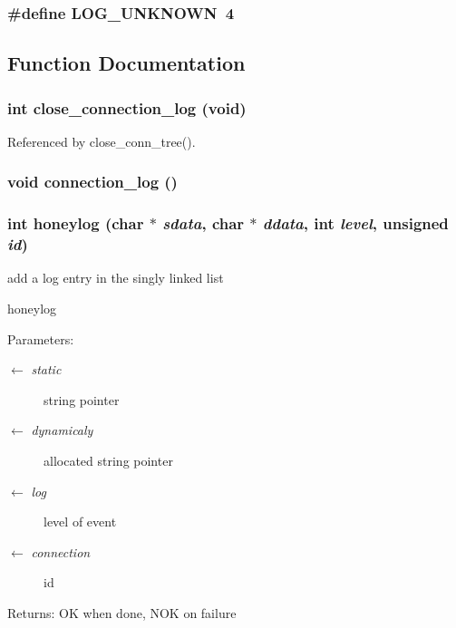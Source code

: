\subsubsection[{LOG\_\-UNKNOWN}]{\setlength{\rightskip}{0pt plus 5cm}\#define LOG\_\-UNKNOWN~4}\label{log_8h_edb0e263c286804ef2ddbe8d7593e7c5}




\subsection{Function Documentation}
\subsubsection[{close\_\-connection\_\-log}]{\setlength{\rightskip}{0pt plus 5cm}int close\_\-connection\_\-log (void)}\label{log_8h_1ae92e71479564f8439adc5636c15212}




Referenced by close\_\-conn\_\-tree().
\subsubsection[{connection\_\-log}]{\setlength{\rightskip}{0pt plus 5cm}void connection\_\-log ()}\label{log_8h_59e4c7db1c7dc67e906d56043168327b}


\subsubsection[{honeylog}]{\setlength{\rightskip}{0pt plus 5cm}int honeylog (char $\ast$ {\em sdata}, \/  char $\ast$ {\em ddata}, \/  int {\em level}, \/  unsigned {\em id})}\label{log_8h_0fd055c418f71f29cf0f2b53a051d48f}


add a log entry in the singly linked list 

honeylog

\begin{Desc}
\item[Parameters:]
\begin{description}
\item[\mbox{$\leftarrow$} {\em static}]string pointer \item[\mbox{$\leftarrow$} {\em dynamicaly}]allocated string pointer \item[\mbox{$\leftarrow$} {\em log}]level of event \item[\mbox{$\leftarrow$} {\em connection}]id\end{description}
\end{Desc}
\begin{Desc}
\item[Returns:]OK when done, NOK on failure \end{Desc}


